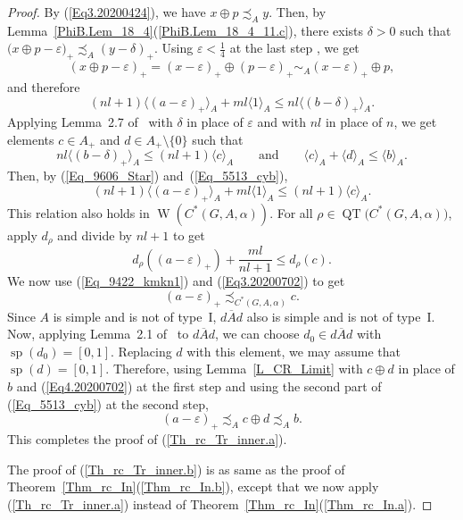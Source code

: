 \documentclass[10pt]{amsart}
\numberwithin{equation}{section}
\theoremstyle{definition}
\newcommand{\af}{\alpha}
\newcommand{\dt}{\delta}
\newcommand{\ep}{\varepsilon}
\newcommand{\spec}{{\operatorname{sp}}}
\newcommand{\QT}{{\operatorname{QT}}}
\newcommand{\W}{{\operatorname{W}}}
\newcommand{\andeqn}{\qquad {\mbox{and}} \qquad}
\newcommand{\CGAa}{C^* (G, A, \af)}
\newcommand{\Lem}[1]{Lemma~\ref{#1}}
\begin{document}
\begin{proof}
By (\ref{Eq3.20200424}), we have $x \oplus p \precsim_{A} y$.
Then, by \Lem{PhiB.Lem_18_4}(\ref{PhiB.Lem_18_4_11.c}), there exists $\dt > 0$ such that
$\big( x \oplus p - \ep \big)_{+}
 \precsim_{A} (y - \dt)_{+}$.
Using $\ep < \frac{1}{4}$ at the last step , we get
 \[
( x \oplus p - \ep )_{+}
  = ( x - \ep )_{+}
     \oplus ( p - \ep )_{+}
  \sim_{A} ( x - \ep )_{+} \oplus p,
\]
and therefore
\begin{equation}\label{Eq_9606_Star}
(nl + 1)
    \langle ( a - \ep )_{+} \rangle_{A}
              + ml \langle 1 \rangle_{A}
  \leq nl \langle (b - \dt)_{+} \rangle_{A}.
\end{equation}
%
Applying Lemma~2.7 of~\cite{Ph14} with $\dt$ in place of $\ep$ and with $nl$ in place of $n$, we get
elements $c \in {A_+}$ and $d \in {A_+} \setminus \{ 0 \}$
such that
%
\begin{equation}\label{Eq_5513_cyb}
nl \langle (b - \dt)_{+} \rangle_{A}
   \leq (nl + 1) \langle c \rangle_{A}
\andeqn
\langle c \rangle_{A} + \langle d \rangle_{A}
  \leq \langle b \rangle_{A}.
\end{equation}
%
Then, by (\ref{Eq_9606_Star}) and~(\ref{Eq_5513_cyb}),
\[
(nl + 1)
  \langle (a - \ep)_{+} \rangle_{A}
              +  ml \langle 1 \rangle_{A}
  \leq (nl + 1) \langle c \rangle_{A}.
\]
This relation also holds in $\W (\CGAa)$.
For all $\rho \in \QT \big(\CGAa \big)$,
apply $d_{\rho}$ and divide by $nl + 1$
to get
\begin{equation}
\label{Eq3.20200702}
d_{\rho} ( (a - \ep)_{+} ) + \frac{ml}{nl + 1}
\leq d_{\rho} (c).
\end{equation}
We now use (\ref{Eq_9422_kmkn1}) and (\ref{Eq3.20200702}) to get 
\begin{equation}
\label{Eq4.20200702}
(a - \ep)_{+} \precsim_{\CGAa} c.
\end{equation}
%
Since $A$ is simple and is  not of type~I,
$\overline{dAd}$ also is simple and is not of type~I. Now, applying Lemma~2.1 of~\cite{Ph14} to $\overline{dAd}$,
we can choose $d_0 \in \overline{dAd}$ with $\spec (d_0)= [0, 1]$.
Replacing $d$ with this element,
we may assume that $\spec (d)= [0, 1]$.
Therefore,
using Lemma~\ref{L_CR_Limit}
with $c \oplus d$ in place of $b$ and (\ref{Eq4.20200702}) at the first step
and using the second part of (\ref{Eq_5513_cyb}) at the second step,
\[
(a - \ep)_{+} \precsim_{A} c \oplus d
  \precsim_{A} b.
\]
This completes the proof of (\ref{Th_rc_Tr_inner.a}).

The proof of (\ref{Th_rc_Tr_inner.b}) is as same as the proof of Theorem~\ref{Thm_rc_In}(\ref{Thm_rc_In.b}),
 except that we now apply
(\ref{Th_rc_Tr_inner.a}) instead of Theorem~\ref{Thm_rc_In}(\ref{Thm_rc_In.a}).
\end{proof}
\end{document}
